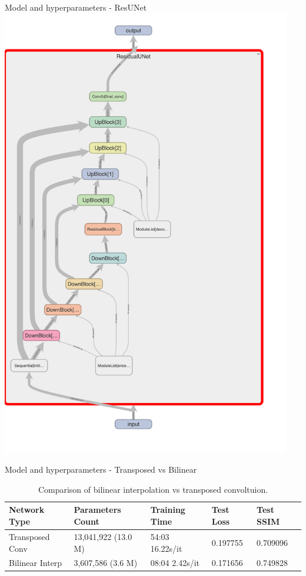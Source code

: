 \documentclass[8pt]{beamer}
\begin{document}
\begin{frame}[fragile]{Model and hyperparameters - ResUNet}
    \center
    \includegraphics[angle=270, width=0.95\textwidth]{images/unet_experiment_graph.png}
\end{frame}

\begin{frame}{Model and hyperparameters - Transposed vs Bilinear}
    \begin{table}[h]
        \centering
        \begin{tabular}{|l|l|l|l|l|}
        \hline
        \textbf{Network Type} & \textbf{Parameters Count} & \textbf{Training Time} & \textbf{Test Loss} & \textbf{Test SSIM} \\
        \hline
        Transposed Conv & 13,041,922 (13.0 M) & 54:03 16.22s/it & 0.197755 & 0.709096 \\
        Bilinear Interp & 3,607,586 (3.6 M) & 08:04 2.42s/it & 0.171656 & 0.749828 \\
        \hline
        \end{tabular}
        \caption{Comparison of bilinear interpolation vs transposed convoltuion.}
        \label{tab:network_comparison}
    \end{table}
\end{frame}
\end{document}
